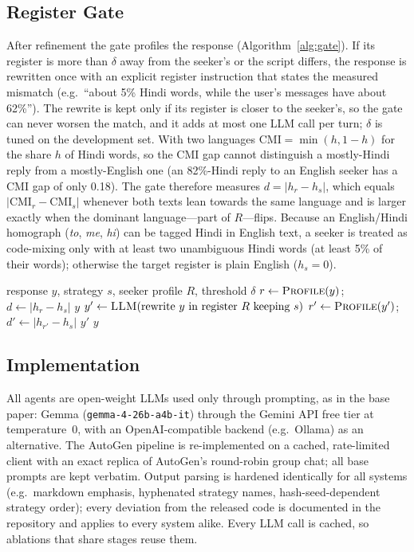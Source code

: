 \documentclass[conference]{IEEEtran}
\newcommand{\cmi}{\mathrm{CMI}}
\begin{document}
\subsection{Register Gate}
After refinement the gate profiles the response (Algorithm~\ref{alg:gate}). If its register is
more than $\delta$ away from the seeker's or the script differs, the response is rewritten once
with an explicit register instruction that states the measured mismatch (e.g.\ ``about 5\% Hindi
words, while the user's messages have about 62\%''). The rewrite is kept only if its register is
closer to the seeker's, so the gate can never worsen the match, and it adds at most one LLM call
per turn; $\delta$ is tuned on the development set. With two languages $\cmi=\min(h,1-h)$ for the
share $h$ of Hindi words, so the CMI gap cannot distinguish a mostly-Hindi reply from a
mostly-English one (an 82\%-Hindi reply to an English seeker has a CMI gap of only 0.18). The
gate therefore measures $d=|h_r-h_s|$, which equals $|\cmi_r-\cmi_s|$ whenever both texts lean
towards the same language and is larger exactly when the dominant language---part of $R$---flips.
Because an English/Hindi homograph (\emph{to}, \emph{me}, \emph{hi}) can be tagged Hindi in
English text, a seeker is treated as code-mixing only with at least two unambiguous Hindi words
(at least 5\% of their words); otherwise the target register is plain English ($h_s=0$).

\begin{algorithm}[t]
\caption{Register Gate}\label{alg:gate}
\begin{algorithmic}[1]
\Require response $y$, strategy $s$, seeker profile $R$, threshold $\delta$
\State $r \gets \textsc{Profile}(y)$; $d \gets |h_r - h_s|$
 \Return $y$ \EndIf
\State $y' \gets \textsc{LLM}(\text{rewrite } y \text{ in register } R \text{ keeping } s)$
\State $r' \gets \textsc{Profile}(y')$; $d' \gets |h_{r'} - h_s|$
 \Return $y'$ \EndIf
\State \Return $y$
\end{algorithmic}
\end{algorithm}

\subsection{Implementation}
All agents are open-weight LLMs used only through prompting, as in the base paper: Gemma
(\texttt{gemma-4-26b-a4b-it}) through the Gemini API free tier at temperature~0, with an
OpenAI-compatible backend (e.g.\ Ollama) as an alternative. The AutoGen pipeline is re-implemented
on a cached, rate-limited client with an exact replica of AutoGen's round-robin group chat; all
base prompts are kept verbatim. Output parsing is hardened identically for all systems (e.g.\
markdown emphasis, hyphenated strategy names, hash-seed-dependent strategy order); every
deviation from the released code is documented in the repository and applies to every system
alike. Every LLM call is cached, so ablations that share stages reuse them.
\end{document}
